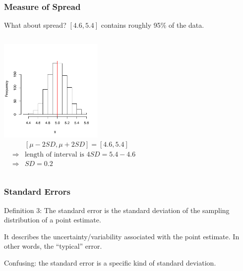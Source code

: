 \documentclass[handout]{beamer}
\newcommand{\blue}[1]{\textcolor{blue2}{#1}}
\begin{document}
\begin{frame}[fragile]
\frametitle{Measure of Spread}
What about spread?  $[4.6, 5.4]$ contains roughly 95\% of the data.

\begin{columns}[c]
\includegraphics[width=5cm]{figure/lec12-001}
\pause{}
\begin{eqnarray*}
&& [\mu - 2 SD, \mu + 2SD] = [4.6, 5.4]\\
&\Rightarrow& \mbox{length of interval is } 4SD = 5.4-4.6\\
&\Rightarrow& SD = 0.2
\end{eqnarray*}
\end{columns}




\end{frame}


\begin{frame}[fragile]
\frametitle{Standard Errors}

\blue{Definition 3}: The \blue{standard error} is the standard deviation of the sampling distribution of a point estimate.  

\pause \vspace{0.5cm}

It describes the uncertainty/variability associated with the point estimate.  In other words, the ``typical'' error.  

\pause \vspace{0.5cm}

\blue{Confusing}:  the \blue{standard error} is a specific kind of standard deviation.

\end{frame}
\end{document}
